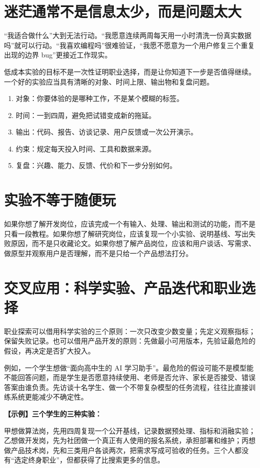 \documentclass[UTF8,zihao=5,openany]{ctexbook}
\begin{document}
\section{迷茫通常不是信息太少，而是问题太大}
“我适合做什么”大到无法行动。“我愿意连续两周每天用一小时清洗一份真实数据吗”就可以行动。“我喜欢编程吗”很难验证，“我愿不愿意为一个用户修复三个重复出现的边界 bug”更接近工作现实。

低成本实验的目标不是一次性证明职业选择，而是让你知道下一步是否值得继续。一个好的实验应当具有清晰的对象、时间上限、输出物和复盘问题。

\begin{enumerate}
\item 对象：你要体验的是哪种工作，不是某个模糊的标签。
\item 时间：一到四周，避免把试错变成新的拖延。
\item 输出：代码、报告、访谈记录、用户反馈或一次公开演示。
\item 约束：规定每天投入时间、工具和数据来源。
\item 复盘：兴趣、能力、反馈、代价和下一步分别如何。
\end{enumerate}

\section{实验不等于随便玩}
如果你想了解开发岗位，应该完成一个有输入、处理、输出和测试的功能，而不是只看一段教程。如果你想了解研究岗位，应该复现一个小实验、说明基线、写出失败原因，而不是只收藏论文。如果你想了解产品岗位，应该和用户谈话、写需求、做原型并观察用户是否理解，而不是只给一个产品想法打分。

\section{交叉应用：科学实验、产品迭代和职业选择}
职业探索可以借用科学实验的三个原则：一次只改变少数变量；先定义观察指标；保留失败记录。也可以借用产品开发的原则：先做最小可用版本，先验证最危险的假设，再决定是否扩大投入。

例如，一个学生想做“面向高中生的 AI 学习助手”。最危险的假设可能不是模型能不能回答问题，而是学生是否愿意持续使用、老师是否允许、家长是否接受、错误答案由谁负责。先访谈十名学生、做一个不带复杂模型的任务流程，往往比直接训练系统更能减少不确定性。

\begin{casebox}
\textbf{【示例】三个学生的三种实验：}

甲想做算法岗，先用四周复现一个公开基线，记录数据预处理、指标和消融实验；乙想做开发岗，先为社团做一个真正有人使用的报名系统，承担部署和维护；丙想做产品技术岗，先和三类用户各谈两次，把需求写成可验收的任务。三个人都没有“选定终身职业”，但都获得了比搜索更多的信息。
\end{casebox}
\end{document}
